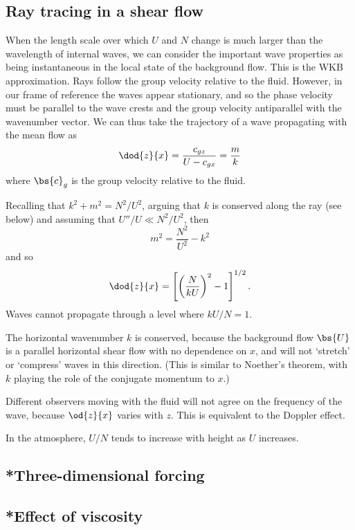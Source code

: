 \subsection{Ray tracing in a shear flow}

When the length scale over which $U$ and $N$ change is much larger than the
wavelength of internal waves, we can consider the important wave properties as
being instantaneous in the local state of the background flow. This is the WKB
approximation. Rays follow the group velocity relative to the fluid. However, in
our frame of reference the waves appear stationary, and so the phase velocity
must be parallel to the wave crests and the group velocity antiparallel with the
wavenumber vector. We can thus take the trajectory of a wave propagating with
the mean flow as
\begin{equation}
	\dod{z}{x} = \frac{c_{gz}}{U - c_{gx}} = \frac{m}{k}
\end{equation}
where $\bs{c}_g$ is the group velocity relative to the fluid.

Recalling that $k^2 + m^2 = N^2 / U^2$, arguing that $k$ is conserved along
the ray (see below) and assuming that $U''/U \ll N^2 /U^2$, then
\begin{equation}
	m^2 = \frac{N^2}{U^2} - k^2
\end{equation}
and so 
\begin{equation}
	\dod{z}{x} = \left[\left(\frac{N}{kU}\right)^2 - 1\right]^{1/2}.
\end{equation}
Waves cannot propagate through a level where $kU/N = 1$.

The horizontal wavenumber $k$ is conserved, because the background flow $\bs{U}$
is a parallel horizontal shear flow with no dependence on $x$, and will not
`stretch' or `compress' waves in this direction. (This is similar to Noether's
theorem, with $k$ playing the role of the conjugate momentum to $x$.)

Different observers moving with the fluid will not agree on the frequency of the
wave, because $\od{z}{x}$ varies with $z$. This is equivalent to the Doppler
effect. 

In the atmosphere, $U/N$ tends to increase with height as $U$ increases.

\subsection{*Three-dimensional forcing}

\subsection{*Effect of viscosity}

